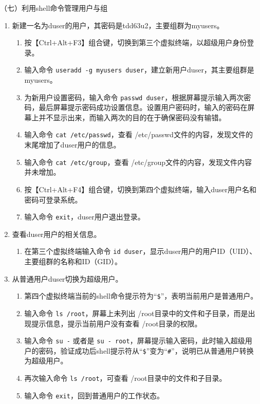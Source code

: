\vspace{0.1in}
（七）利用shell命令管理用户与组
\begin{enumerate}
  \item 新建一名为duser的用户，其密码是tdd63u2，主要组群为myusers。
    \begin{enumerate}
      \item 按【Ctrl+Alt+F3】组合键，切换到第三个虚拟终端，以超级用户身份登录。
      \item 输入命令 \verb|useradd -g myusers duser|，建立新用户duser，其主要组群是myusers。
      \item 为新用户设置密码，输入命令 \verb|passwd duser|，根据屏幕提示输入两次密码，最后屏幕提示密码成功设置信息。设置用户密码时，输入的密码在屏幕上并不显示出来，而输入两次的目的在于确保密码没有输错。
      \item 输入命令 \verb|cat /etc/passwd|，查看 /etc/passwd文件的内容，发现文件的末尾增加了duser用户的信息。
      \item 输入命令 \verb|cat /etc/group|，查看 /etc/group文件的内容，发现文件内容并未增加。
      \item 按【Ctrl+Alt+F4】组合键，切换到第四个虚拟终端，输入duser用户名和密码可登录系统。
      \item 输入命令 \verb|exit|，duser用户退出登录。
    \end{enumerate}
  \item 查看duser用户的相关信息。
    \begin{enumerate}
      \item 在第三个虚拟终端输入命令 \verb|id duser|，显示duser用户的用户ID（UID）、主要组群的名称和ID（GID）。
    \end{enumerate}
  \item 从普通用户duser切换为超级用户。
    \begin{enumerate}
      \item 第四个虚拟终端当前的shell命令提示符为“\verb|$|”，表明当前用户是普通用户。
      \item 输入命令 \verb|ls /root|，屏幕上未列出 /root目录中的文件和子目录，而是出现提示信息，提示当前用户没有查看 /root目录的权限。
      \item 输入命令 \verb|su -| 或者是 \verb|su - root|，屏幕提示输入密码，此时输入超级用户的密码，验证成功后shell提示符从“\verb|$|”变为“\verb|#|”，说明已从普通用户转换为超级用户。
      \item 再次输入命令 \verb|ls /root|，可查看 /root目录中的文件和子目录。
      \item 输入命令 \verb|exit|，回到普通用户的工作状态。

\end{enumerate}
\end{enumerate}
